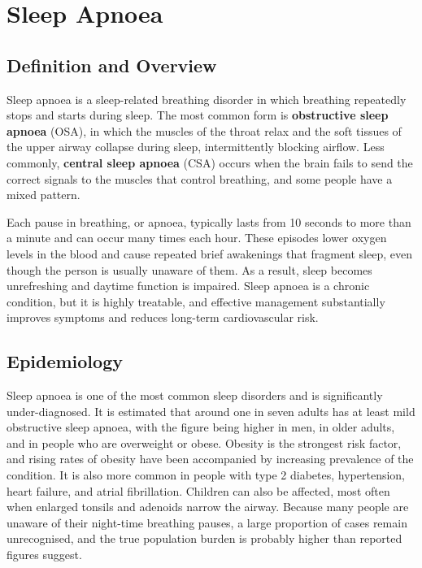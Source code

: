 \chapter{Sleep Apnoea}

\section*{Definition and Overview}
Sleep apnoea is a sleep-related breathing disorder in which breathing repeatedly stops and starts during sleep. The most common form is \textbf{obstructive sleep apnoea} (OSA), in which the muscles of the throat relax and the soft tissues of the upper airway collapse during sleep, intermittently blocking airflow. Less commonly, \textbf{central sleep apnoea} (CSA) occurs when the brain fails to send the correct signals to the muscles that control breathing, and some people have a mixed pattern.

Each pause in breathing, or apnoea, typically lasts from 10 seconds to more than a minute and can occur many times each hour. These episodes lower oxygen levels in the blood and cause repeated brief awakenings that fragment sleep, even though the person is usually unaware of them. As a result, sleep becomes unrefreshing and daytime function is impaired. Sleep apnoea is a chronic condition, but it is highly treatable, and effective management substantially improves symptoms and reduces long-term cardiovascular risk.

\section*{Epidemiology}
Sleep apnoea is one of the most common sleep disorders and is significantly under-diagnosed. It is estimated that around one in seven adults has at least mild obstructive sleep apnoea, with the figure being higher in men, in older adults, and in people who are overweight or obese. Obesity is the strongest risk factor, and rising rates of obesity have been accompanied by increasing prevalence of the condition. It is also more common in people with type 2 diabetes, hypertension, heart failure, and atrial fibrillation. Children can also be affected, most often when enlarged tonsils and adenoids narrow the airway. Because many people are unaware of their night-time breathing pauses, a large proportion of cases remain unrecognised, and the true population burden is probably higher than reported figures suggest.

